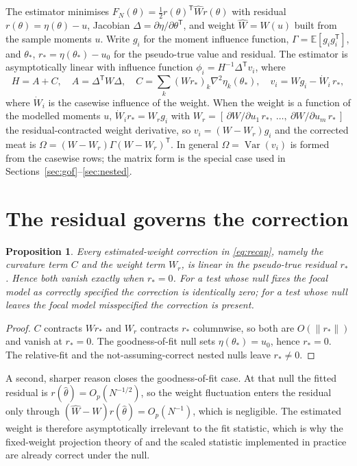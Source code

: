 \documentclass[11pt]{article}
\newcommand{\E}{\mathbb{E}}
\newcommand{\Var}{\operatorname{Var}}
\newcommand{\T}{^{\mathsf{T}}}
\newcommand{\Wr}{W_{\!r}}
\newcommand{\rs}{r_{*}}
\newcommand{\ths}{\theta_{*}}
\theoremstyle{plain}
\newtheorem{proposition}{Proposition}
\theoremstyle{remark}
\begin{document}
The estimator minimises $F_{N}(\theta)=\tfrac12 r(\theta)\T\widehat{W}r(\theta)$
with residual $r(\theta)=\eta(\theta)-u$, Jacobian $\Delta=\partial\eta/\partial
\theta\T$, and weight $\widehat{W}=W(u)$ built from the sample moments $u$. Write
$g_{i}$ for the moment influence function, $\Gamma=\E[g_{i}g_{i}\T]$, and $\ths$,
$\rs=\eta(\ths)-u_{0}$ for the pseudo-true value and residual. The estimator is
asymptotically linear with influence function $\phi_{i}=H^{-1}\Delta\T
v_{i}$, where
\begin{equation}
  H = A + C,\quad A=\Delta\T W\Delta,\quad
  C=\sum_{k}(W\rs)_{k}\nabla^{2}\eta_{k}(\ths),\quad
  v_{i}=Wg_{i}-\dot W_{i}\,\rs,
  \label{eq:recap}
\end{equation}
where $\dot W_{i}$ is the casewise influence of the weight. When the weight is a
function of the modelled moments $u$, $\dot W_{i}\rs=\Wr g_{i}$ with
$\Wr=[\,\partial W/\partial u_{1}\,\rs,\ \dots,\ \partial W/\partial u_{m}\,
\rs\,]$ the residual-contracted weight derivative, so $v_{i}=(W-\Wr)g_{i}$ and
the corrected meat is $\Omega=(W-\Wr)\Gamma(W-\Wr)\T$. In general $\Omega=
\Var(v_{i})$ is formed from the casewise rows; the matrix form is the special
case used in Sections~\ref{sec:gof}--\ref{sec:nested}.

\section{The residual governs the correction}
\label{sec:delin}

\begin{proposition}
\label{prop:delin}
Every estimated-weight correction in \eqref{eq:recap}, namely the curvature
term $C$ and the weight term $\Wr$, is linear in the pseudo-true residual
$\rs$. Hence both vanish exactly when $\rs=0$. For a test whose null fixes the
focal model as correctly specified the correction is identically zero; for a
test whose null leaves the focal model misspecified the correction is present.
\end{proposition}

\begin{proof}
$C$ contracts $W\rs$ and $\Wr$ contracts $\rs$ columnwise, so both are $O(\lVert
\rs\rVert)$ and vanish at $\rs=0$. The goodness-of-fit null sets $\eta(\ths)=
u_{0}$, hence $\rs=0$. The relative-fit and the not-assuming-correct nested
nulls leave $\rs\neq0$.
\end{proof}

A second, sharper reason closes the goodness-of-fit case. At that null the
fitted residual is $r(\widehat\theta)=O_{p}(N^{-1/2})$, so the weight
fluctuation enters the residual only through $(\widehat W-W)r(\widehat\theta)=
O_{p}(N^{-1})$, which is negligible. The estimated weight is therefore
asymptotically irrelevant to the fit statistic, which is why the fixed-weight
projection theory of \cite{satorra1989} and the scaled statistic implemented in
practice are already correct under the null.
\end{document}
